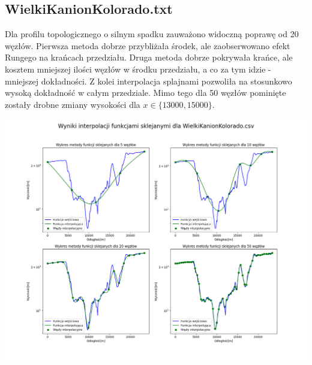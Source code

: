 \documentclass[a4paper,12pt]{article}
\begin{document}
    \newpage
	\subsection{WielkiKanionKolorado.txt}
	Dla profilu topologicznego o silnym spadku zauważono widoczną poprawę od 20 węzłów. Pierwsza metoda dobrze przybliżała środek, ale zaobserwowano efekt Rungego na krańcach przedziału. Druga metoda dobrze pokrywała krańce, ale kosztem mniejszej ilości węzłów w środku przedziału, a co za tym idzie - mniejszej dokładności. Z kolei interpolacja splajnami pozwoliła na stosunkowo wysoką dokładność w całym przedziale. Mimo tego dla 50 węzłów pominięte zostały drobne zmiany wysokości dla $x \in \{13000, 15000\}$.
	\begin{center}
        \includegraphics[scale=0.4]{../charts/cubic_spline_WielkiKanionKolorado.png}
    \end{center}
    
\end{document}
